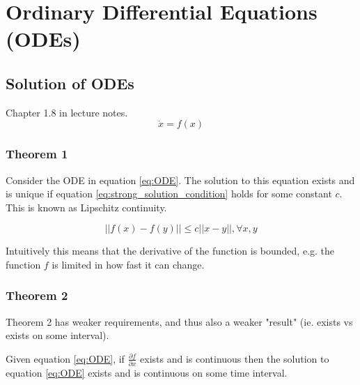 \section{Ordinary Differential Equations (ODEs)}

\subsection{Solution of ODEs}
Chapter 1.8 in lecture notes.
\begin{equation}
\label{eq:ODE}
    \dot{x} = f(x)
\end{equation}
\subsubsection{Theorem 1}

Consider the ODE in equation \ref{eq:ODE}. The solution to this equation exists and is unique if equation \ref{eq:strong_solution_condition} holds for some constant $c$. This is known as Lipschitz continuity. 

\begin{equation}
\label{eq:strong_solution_condition}
    ||f(x)-f(y)|| \leq c||x-y||, \forall x, y
\end{equation}

Intuitively this means that the derivative of the function is bounded, e.g. the function $f$ is limited in how fast it can change.
\subsubsection{Theorem 2}
Theorem 2 has weaker requirements, and thus also a weaker "result" (ie. exists vs exists on some interval). 

Given equation \ref{eq:ODE}, if $\frac{\partial f}{\partial x}$ exists and is continuous then the solution to equation \ref{eq:ODE} exists and is continuous on some time interval. 

